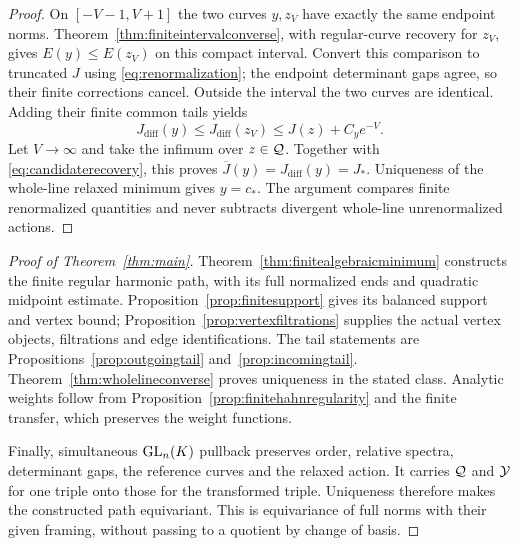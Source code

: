 \begin{proof}
On $[-V-1,V+1]$ the two curves $y,z_V$ have exactly the same
endpoint norms. Theorem~\ref{thm:finiteintervalconverse},
with regular-curve recovery for $z_V$, gives
$E(y)\le E(z_V)$ on this compact interval. Convert this
comparison to truncated $J$ using
\eqref{eq:renormalization}; the endpoint determinant gaps
agree, so their finite corrections cancel. Outside the
interval the two curves are identical. Adding their finite
common tails yields
\[
 J_{\mathrm{diff}}(y)\le J_{\mathrm{diff}}(z_V)
                      \le J(z)+C_y e^{-V}.
\]
Let $V\to\infty$ and take the infimum over $z\in\mathcal Q$.
Together with \eqref{eq:candidaterecovery}, this proves
$\overline J(y)=J_{\mathrm{diff}}(y)=J_*$.
Uniqueness of the whole-line relaxed minimum gives $y=c_*$.
The argument compares finite renormalized quantities and never
subtracts divergent whole-line unrenormalized actions.
\end{proof}

\begin{proof}[Proof of Theorem~\ref{thm:main}]
Theorem~\ref{thm:finitealgebraicminimum} constructs the finite
regular harmonic path, with its full normalized ends and
quadratic midpoint estimate. Proposition~\ref{prop:finitesupport}
gives its balanced support and vertex bound;
Proposition~\ref{prop:vertexfiltrations} supplies the actual
vertex objects, filtrations and edge identifications.
The tail statements are
Propositions~\ref{prop:outgoingtail} and~\ref{prop:incomingtail}.
Theorem~\ref{thm:wholelineconverse} proves uniqueness in the
stated class. Analytic weights follow from
Proposition~\ref{prop:finitehahnregularity} and the finite
transfer, which preserves the weight functions.

Finally, simultaneous $\operatorname{GL}_n(K)$ pullback preserves order,
relative spectra, determinant gaps, the reference curves and
the relaxed action. It carries $\mathcal Q$ and $\mathcal Y$ for one
triple onto those for the transformed triple. Uniqueness
therefore makes the constructed path equivariant. This is
equivariance of full norms with their given framing, without
passing to a quotient by change of basis.
\end{proof}
